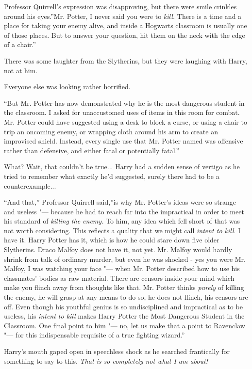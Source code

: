 Professor Quirrell's expression was disapproving, but there were smile
crinkles around his eyes.''Mr. Potter, I never said you were to
\emph{kill.} There is a time and a place for taking your enemy alive,
and inside a Hogwarts classroom is usually one of those places. But to
answer your question, hit them on the neck with the edge of a chair.''

There was some laughter from the Slytherins, but they were laughing with
Harry, not at him.

Everyone else was looking rather horrified.

``But Mr. Potter has now demonstrated why he is the most dangerous
student in the classroom. I asked for unaccustomed uses of items in this
room for combat. Mr. Potter could have suggested using a desk to block a
curse, or using a chair to trip an oncoming enemy, or wrapping cloth
around his arm to create an improvised shield. Instead, every single use
that Mr. Potter named was offensive rather than defensive, and either
fatal or potentially fatal.''

What? Wait, that couldn't be true... Harry had a sudden sense of
vertigo as he tried to remember what exactly he'd suggested, surely
there had to be a counterexample...

``And that,'' Professor Quirrell said,''is why Mr. Potter's ideas were
so strange and useless "--- because he had to reach far into the
impractical in order to meet his standard of \emph{killing the enemy.}
To him, any idea which fell short of that was not worth considering.
This reflects a quality that we might call \emph{intent to kill}. I have
it. Harry Potter has it, which is how he could stare down five older
Slytherins. Draco Malfoy does not have it, not yet. Mr. Malfoy would
hardly shrink from talk of ordinary murder, but even he was shocked -
yes you were Mr. Malfoy, I was watching your face "--- when Mr. Potter
described how to use his classmates' bodies as raw material. There are
censors inside your mind which make you flinch away from thoughts like
that. Mr. Potter thinks \emph{purely} of killing the enemy, he will
grasp at any means to do so, he does not flinch, his censors are off.
Even though his youthful genius is so undisciplined and impractical as
to be useless, his \emph{intent to kill} makes Harry Potter the Most
Dangerous Student in the Classroom. One final point to him "--- no, let us
make that a point to Ravenclaw "--- for this indispensable requisite of a
true fighting wizard.''

Harry's mouth gaped open in speechless shock as he searched frantically
for something to say to this. \emph{That is so completely not what I am
about!}

